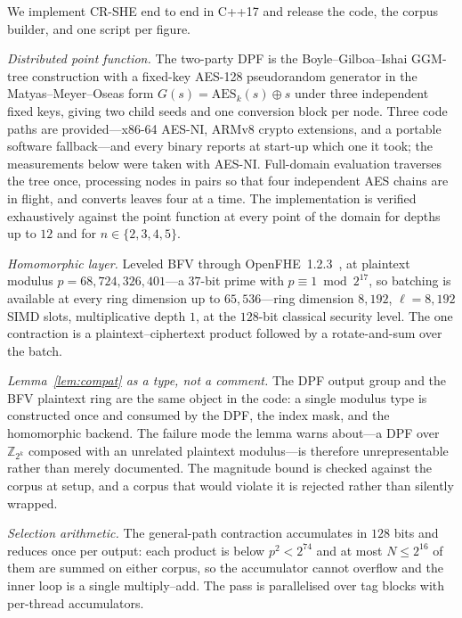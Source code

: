 \documentclass[journal]{IEEEtran}
\begin{document}
We implement CR-SHE end to end in C++17 and release the code, the corpus
builder, and one script per figure.

\emph{Distributed point function.} The two-party DPF is the Boyle--Gilboa--Ishai
GGM-tree construction with a fixed-key AES-128 pseudorandom generator in the
Matyas--Meyer--Oseas form $G(s)=\mathrm{AES}_k(s)\oplus s$ under three
independent fixed keys, giving two child seeds and one conversion block per
node. Three code paths are provided---x86-64 AES-NI, ARMv8 crypto extensions,
and a portable software fallback---and every binary reports at start-up which
one it took; the measurements below were taken with AES-NI. Full-domain
evaluation traverses the tree once, processing nodes in pairs so that four
independent AES chains are in flight, and converts leaves four at a time. The
implementation is verified exhaustively against the point function at every
point of the domain for depths up to $12$ and for $n\in\{2,3,4,5\}$.

\emph{Homomorphic layer.} Leveled BFV through OpenFHE~1.2.3~\cite{openfhe}, at
plaintext modulus $p=68{,}724{,}326{,}401$---a $37$-bit prime with
$p\equiv 1 \bmod 2^{17}$, so batching is available at every ring dimension up to
$65{,}536$---ring dimension $8{,}192$, $\ell=8{,}192$ SIMD slots, multiplicative
depth $1$, at the $128$-bit classical security level. The one contraction is a
plaintext--ciphertext product followed by a rotate-and-sum over the batch.

\emph{Lemma~\ref{lem:compat} as a type, not a comment.} The DPF output group and
the BFV plaintext ring are the same object in the code: a single modulus type is
constructed once and consumed by the DPF, the index mask, and the homomorphic
backend. The failure mode the lemma warns about---a DPF over $\mathbb{Z}_{2^k}$
composed with an unrelated plaintext modulus---is therefore unrepresentable
rather than merely documented. The magnitude bound is checked against the corpus
at setup, and a corpus that would violate it is rejected rather than silently
wrapped.

\emph{Selection arithmetic.} The general-path contraction accumulates in $128$
bits and reduces once per output: each product is below $p^2<2^{74}$ and at most
$N\le 2^{16}$ of them are summed on either corpus, so the accumulator cannot
overflow and the inner loop is a single multiply--add. The pass is parallelised over tag blocks
with per-thread accumulators.
\end{document}
